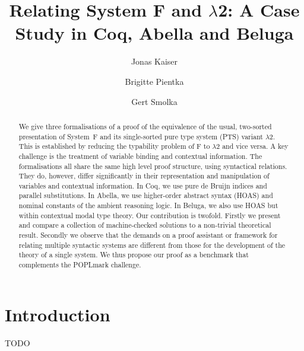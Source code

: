 \documentclass[a4paper,UKenglish]{lipics-v2016}
\title{Relating System F and $\lambda$2: A Case Study in Coq, Abella and Beluga}
\author[1]{Jonas Kaiser}
\author[2]{Brigitte Pientka}
\author[1]{Gert Smolka}
\affil[1]{Saarland University, Saarbrücken, Germany\\
  \texttt{\{jkaiser,smolka\}}@ps.uni-saarland.de}
\affil[2]{school, city, country\\
  \texttt{MAIL}}
\newcommand{\SysL}{$\lambda$2\xspace}
\begin{document}
\maketitle

\begin{abstract}
  We give three formalisations of a proof of the equivalence of the usual, two-sorted presentation of System~F and its single-sorted pure type system (PTS) variant \SysL.
  This is established by reducing the typability problem of F to \SysL and vice versa.
  A key challenge is the treatment of variable binding and contextual information.
  The formalisations all share the same high level proof structure, using syntactical relations.
  They do, however, differ significantly in their representation and manipulation of variables and contextual information.
  In Coq, we use pure de Bruijn indices and parallel substitutions.
  In Abella, we use higher-order abstract syntax (HOAS) and nominal constants of the ambient reasoning logic.
  In Beluga, we also use HOAS but within contextual modal type theory.
  Our contribution is twofold.
  Firstly we present and compare a collection of machine-checked solutions to a non-trivial theoretical result.
  Secondly we observe that the demands on a proof assistant or framework for relating multiple syntactic systems are different from those for the development of the theory of a single system.
  We thus propose our proof as a benchmark that complements the POPLmark challenge.
\end{abstract}

\section{Introduction}

TODO
\end{document}
